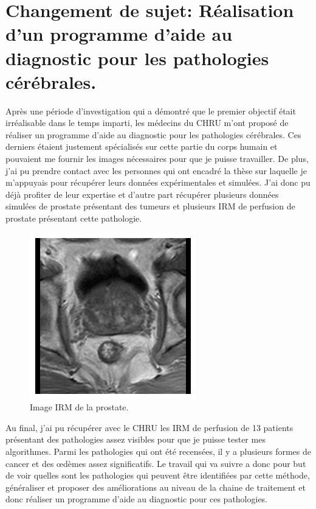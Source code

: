 \chapter{Changement de sujet: Réalisation d'un programme d'aide au diagnostic pour les pathologies cérébrales.}


Après une période d'investigation qui a démontré que le premier objectif était irréalisable dans le temps imparti, les médecins du CHRU m'ont proposé de réaliser un programme d'aide au diagnostic pour les pathologies cérébrales. Ces derniers étaient justement spécialisés sur cette partie du corps humain et pouvaient me fournir les images nécessaires pour que je puisse travailler. 
De plus, j'ai pu prendre contact avec les personnes qui ont encadré la thèse sur laquelle je m'appuyais pour récupérer leurs données expérimentales et simulées. J'ai donc pu déjà profiter de leur expertise et d'autre part récupérer plusieurs données simulées de prostate présentant des tumeurs et plusieurs IRM de perfusion de prostate présentant cette pathologie.

\begin{figure}[H]
\centering
    \includegraphics[scale=1,angle=0]{Images/ProstateImage.png}
    \caption{Image IRM de la prostate.}
    \label{fig:ProstateImage}
\end{figure}

Au final, j'ai pu récupérer avec le CHRU les IRM de perfusion de 13 patients présentant des pathologies assez visibles pour que je puisse tester mes algorithmes. Parmi les pathologies qui ont été recensées, il y a plusieurs formes de cancer et des œdèmes assez significatifs. Le travail qui va suivre a donc pour but de voir quelles sont les pathologies qui peuvent être identifiées par cette méthode, généraliser et proposer des améliorations au niveau de la chaine de traitement et donc réaliser un programme d'aide au diagnostic pour ces pathologies.




